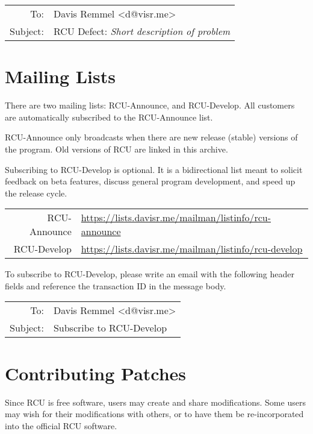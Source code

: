 \vspace{0.5cm}
\begin{tabular}{rl}
To:& Davis Remmel \textless d@visr.me\textgreater \\
Subject:& RCU Defect: \textit{Short description of problem}
\end{tabular}


\section{Mailing Lists}
There are two mailing lists: RCU-Announce, and RCU-Develop. All customers are automatically subscribed to the RCU-Announce list.

RCU-Announce only broadcasts when there are new release (stable) versions of the program. Old versions of RCU are linked in this archive.

Subscribing to RCU-Develop is optional. It is a bidirectional list meant to solicit feedback on beta features, discuss general program development, and speed up the release cycle.

\vspace{0.5cm}
\begin{tabular}{rl}
RCU-Announce& \href{https://lists.davisr.me/mailman/listinfo/rcu-announce}{https://lists.davisr.me/mailman/listinfo/rcu-announce} \\
RCU-Develop& \href{https://lists.davisr.me/mailman/listinfo/rcu-develop}{https://lists.davisr.me/mailman/listinfo/rcu-develop}
\end{tabular}
\vspace{0.5cm}

To subscribe to RCU-Develop, please write an email with the following header fields and reference the transaction ID in the message body.

\vspace{0.5cm}
\begin{tabular}{rl}
To:& Davis Remmel \textless d@visr.me\textgreater \\
Subject:& Subscribe to RCU-Develop
\end{tabular}


\section{Contributing Patches}
Since RCU is free software, users may create and share modifications. Some users may wish for their modifications with others, or to have them be re-incorporated into the official RCU software.

